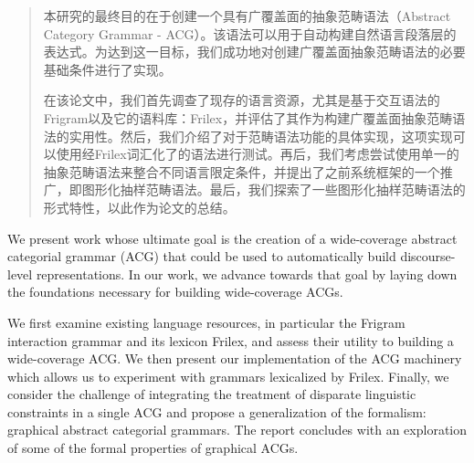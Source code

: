 
\begin{abstract}

本研究的最终目的在于创建一个具有广覆盖面的抽象范畴语法（Abstract Category Grammar - ACG）。该语法可以用于自动构建自然语言段落层的表达式。为达到这一目标，我们成功地对创建广覆盖面抽象范畴语法的必要基础条件进行了实现。

在该论文中，我们首先调查了现存的语言资源，尤其是基于交互语法的Frigram以及它的语料库：Frilex，并评估了其作为构建广覆盖面抽象范畴语法的实用性。然后，我们介绍了对于范畴语法功能的具体实现，这项实现可以使用经Frilex词汇化了的语法进行测试。再后，我们考虑尝试使用单一的抽象范畴语法来整合不同语言限定条件，并提出了之前系统框架的一个推广，即图形化抽样范畴语法。最后，我们探索了一些图形化抽样范畴语法的形式特性，以此作为论文的总结。

\end{abstract}

\begin{englishabstract}

We present work whose ultimate goal is the creation of a wide-coverage
abstract categorial grammar (ACG) that could be used to automatically build
discourse-level representations. In our work, we advance towards that goal by
laying down the foundations necessary for building wide-coverage ACGs.

We first examine existing language resources, in particular the Frigram
interaction grammar and its lexicon Frilex, and assess their utility to
building a wide-coverage ACG. We then present our implementation of the ACG
machinery which allows us to experiment with grammars lexicalized by
Frilex. Finally, we consider the challenge of integrating the treatment of
disparate linguistic constraints in a single ACG and propose a generalization
of the formalism: graphical abstract categorial grammars. The report concludes
with an exploration of some of the formal properties of graphical ACGs.

\end{englishabstract}
